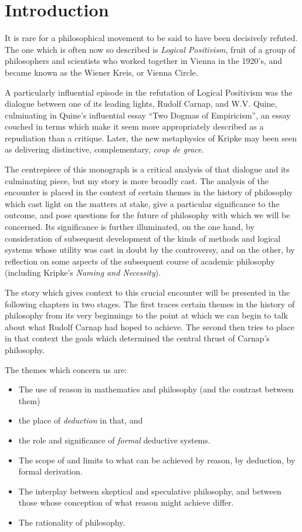 \mainmatter

\chapter{Introduction}

It is rare for a philosophical movement to be said to have been decisively refuted.
The one which is often now so described is {\it Logical Positivism}, fruit of a group of philosophers and scientists who worked together in Vienna in the 1920's, and became known as the Wiener Kreis, or Vienna Circle.

A particularly influential episode in the refutation of Logical Positivism was the dialogue between one of its leading lights, Rudolf Carnap, and W.V. Quine, culminating in Quine's influential essay ``Two Dogmas of Empiricism'', an essay couched in terms which make it seem more appropriately described as a repudiation than a critique.
Later, the new metaphysics of Kripke may been seen as delivering distinctive, complementary, {\it coup de grace}.

The centrepiece of this monograph is a critical analysis of that dialogue and its culminating piece, but my story is more broadly cast.
The analysis of the encounter is placed in the context of certain themes in the history of philosophy which cast light on the matters at stake, give a particular significance to the outcome, and pose questions for the future of philosophy with which we will be concerned.
Its significance is further illuminated, on the one hand, by consideration of subsequent development of the kinds of methods and logical systems whose utility was cast in doubt by the controversy, and on the other, by reflection on some aspects of the subsequent course of academic philosophy (including Kripke's {\it Naming and Necessity}\cite{kripke72}).

The story which gives context to this crucial encounter will be presented in the following chapters in two stages.
The first traces certain themes in the history of philosophy from its very beginnings to the point at which we can begin to talk about what Rudolf Carnap had hoped to achieve.
The second then tries to place in that context the goals which determined the central thrust of Carnap's philosophy.

The themes which concern us are:
\begin{itemize}
\item The use of reason in mathematics and philosophy (and the contrast between them)
\item the place of {\it deduction} in that, and
\item the role and significance of {\it formal} deductive systems.
\item The scope of and limits to what can be achieved by reason, by deduction, by formal derivation.
\item The interplay between skeptical and speculative philosophy, and between those whose conception of what reason might achieve differ.
\item The rationality of philosophy.
\end{itemize}

